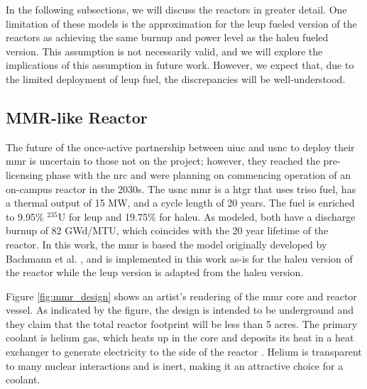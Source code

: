 In the following subsections, we will discuss the reactors in greater detail. One limitation of these models is the approximation for the \gls{leup} fueled version of the reactors as achieving the same burnup and power level as the \gls{haleu} fueled version. This assumption is not necessarily valid, and we will explore the implications of this assumption in future work. However, we expect that, due to the limited deployment of \gls{leup} fuel, the discrepancies will be well-understood.

\subsection{MMR-like Reactor}
\label{sec:mmr}

The future of the once-active partnership between \gls{uiuc} and \gls{usnc} to deploy their \gls{mmr} is uncertain to those not on the project; however, they reached the pre-licensing phase with the \gls{nrc} and were planning on commencing operation of an on-campus reactor in the 2030s. The \gls{usnc} \gls{mmr} is a \gls{htgr} that uses \gls{triso} fuel, has a thermal output of 15 MW, and a cycle length of 20 years. The fuel is enriched to 9.95\% $^{235}$U for \gls{leup} and 19.75\% for \gls{haleu}. As modeled, both have a discharge burnup of 82 GWd/MTU, which coincides with the 20 year lifetime of the reactor. In this work, the \gls{mmr} is based the model originally developed by Bachmann et al. \cite{bachmann_mmr_like_2023}, and is implemented in this work as-is for the \gls{haleu} version of the reactor while the \gls{leup} version is adapted from the \gls{haleu} version.

Figure \ref{fig:mmr_design} shows an artist's rendering of the \gls{mmr} core and reactor vessel. As indicated by the figure, the design is intended to be underground and they claim that the total reactor footprint will be less than 5 acres. The primary coolant is helium gas, which heats up in the core and deposits its heat in a heat exchanger to generate electricity to the side of the reactor \cite{usnc_chalk_river}. Helium is transparent to many nuclear interactions and is inert, making it an attractive choice for a coolant.

